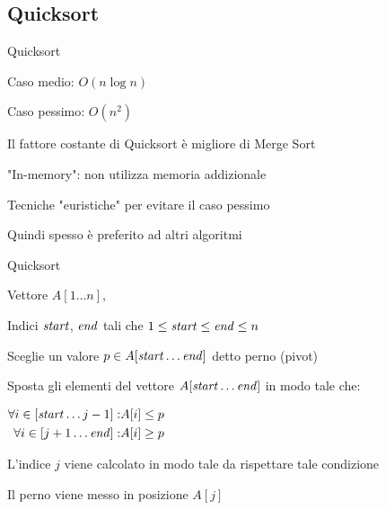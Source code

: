 \subsection{Quicksort}

\begin{frame}{Quicksort}
	
\BI
\item Caso medio: $O(n \log n)$
\item Caso pessimo: $O(n^2)$
\EI

\BI
\item Il fattore costante di Quicksort è migliore di Merge Sort
\item "In-memory": non utilizza memoria addizionale
\item Tecniche "euristiche" per evitare il caso pessimo
\item Quindi spesso è preferito ad altri algoritmi
\EI

\smallskip
{}
\end{frame}


\begin{frame}{Quicksort}

\BI
\item Vettore $A[1 \ldots n]$, 
\item Indici $\mathit{start}$, $\mathit{end}$ tali che $1 \leq \mathit{start} \leq \mathit{end} \leq n$
\EI

\medskip
{}
\BIL
\item Sceglie un valore $p \in A[\mathit{start} \ldots \mathit{end}]$ 
  detto \alert{perno} (\alert{pivot})
\item Sposta gli elementi del vettore $A[\mathit{start} \ldots \mathit{end}]$ in modo
tale che:

$ \displaystyle
    \begin{aligned}
  \forall i \in [\mathit{start} \ldots j - 1]: &A[i] \leq p \\
  \forall i \in [j + 1 \ldots \mathit{end}]: &A[i] \geq p \\
 \end{aligned}
  $
\item L'indice $j$ viene calcolato in modo tale da rispettare tale condizione
\item Il perno viene messo in posizione $A[j]$
\EIL

\end{frame}

